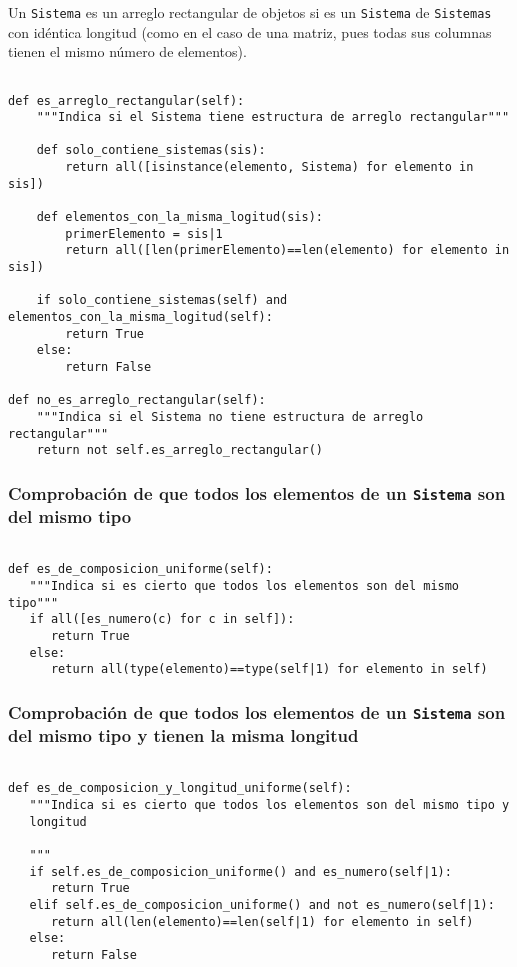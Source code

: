 \documentclass[11pt]{report}
\begin{document}
Un \texttt{Sistema} es un arreglo rectangular de objetos si es un \texttt{Sistema}
de \texttt{Sistemas} con idéntica longitud (como en el caso de una matriz,
pues todas sus columnas tienen el mismo número de elementos).
\begin{verbatim}

def es_arreglo_rectangular(self):
    """Indica si el Sistema tiene estructura de arreglo rectangular"""

    def solo_contiene_sistemas(sis):
        return all([isinstance(elemento, Sistema) for elemento in sis])

    def elementos_con_la_misma_logitud(sis):
        primerElemento = sis|1
        return all([len(primerElemento)==len(elemento) for elemento in sis])

    if solo_contiene_sistemas(self) and elementos_con_la_misma_logitud(self):
        return True
    else:
        return False

def no_es_arreglo_rectangular(self):
    """Indica si el Sistema no tiene estructura de arreglo rectangular"""
    return not self.es_arreglo_rectangular()

\end{verbatim}

\subsubsection{Comprobación de que todos los elementos de un \texttt{Sistema} son del mismo tipo}
\label{sec:org2a0bdda}

\begin{verbatim}

def es_de_composicion_uniforme(self):
   """Indica si es cierto que todos los elementos son del mismo tipo"""
   if all([es_numero(c) for c in self]):
      return True
   else:
      return all(type(elemento)==type(self|1) for elemento in self)

\end{verbatim}

\subsubsection{Comprobación de que todos los elementos de un \texttt{Sistema} son del mismo tipo y tienen la misma longitud}
\label{sec:org2815998}

\begin{verbatim}

def es_de_composicion_y_longitud_uniforme(self):
   """Indica si es cierto que todos los elementos son del mismo tipo y
   longitud

   """
   if self.es_de_composicion_uniforme() and es_numero(self|1):
      return True
   elif self.es_de_composicion_uniforme() and not es_numero(self|1):
      return all(len(elemento)==len(self|1) for elemento in self)
   else:
      return False
   
\end{verbatim}
\end{document}
